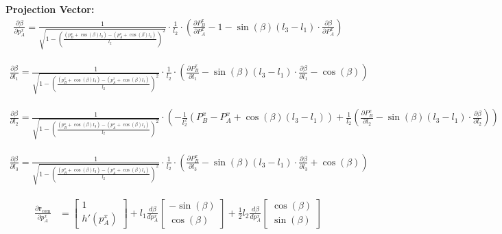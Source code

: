 \documentclass[10pt]{article}
\begin{document}
\textbf{Projection Vector: }
\begin{align*}
\frac{\partial \beta}{\partial p_A^x} = 
\frac{1}{\sqrt{1 - \left( \frac{(p_B^x + \cos(\beta) l_3) - (p_A^x + \cos(\beta) l_1)}{l_2} \right)^2}} 
\cdot 
\frac{1}{l_2}
\cdot 
\left( 
    \frac{\partial P_B^x}{\partial P_A^x}
    - 1
    -\sin(\beta)(l_3-l_1)\cdot \frac{\partial \beta}{\partial P_A^x}
\right)
\end{align*}

\begin{align*}
\frac{\partial \beta}{\partial l_1} = 
\frac{1}{\sqrt{1 - \left( \frac{(p_B^x + \cos(\beta) l_3) - (p_A^x + \cos(\beta) l_1)}{l_2} \right)^2}} 
\cdot 
\frac{1}{l_2}
\cdot 
\left( 
  \frac{\partial P_B^x}{\partial l_1}
  - \sin(\beta)(l_3 - l_1) \cdot \frac{\partial \beta}{\partial l_1}
  - \cos(\beta)
\right)
\end{align*}

\begin{align*}
\frac{\partial \beta}{\partial l_2} = 
\frac{1}{\sqrt{1 - \left( \frac{(p_B^x + \cos(\beta) l_3) - (p_A^x + \cos(\beta) l_1)}{l_2} \right)^2}} 
\cdot 
(
-\frac{1}{l_2^2}
\left( 
P_B^x - P_A^x + \cos(\beta)(l_3-l_1)
\right)
+
\frac{1}{l_2}
\left( 
  \frac{\partial P_B^x}{\partial l_2}
  - \sin(\beta)(l_3 - l_1) \cdot \frac{\partial \beta}{\partial l_2}
\right)
)
\end{align*}

\begin{align*}
\frac{\partial \beta}{\partial l_3} = 
\frac{1}{\sqrt{1 - \left( \frac{(p_B^x + \cos(\beta) l_3) - (p_A^x + \cos(\beta) l_1)}{l_2} \right)^2}} 
\cdot 
\frac{1}{l_2}
\cdot 
\left( 
  \frac{\partial P_B^x}{\partial l_3}
  - \sin(\beta)(l_3 - l_1) \cdot \frac{\partial \beta}{\partial l_3}
  + \cos(\beta)
\right)
\end{align*}

\begin{align*}
\frac{\partial \mathbf{r}_{\mathrm{com}}}{\partial p_A^x} &= 
\begin{bmatrix}
1 \\
h'(p_A^x)
\end{bmatrix}
+
l_1 \frac{d\beta}{dp_A^x}
\begin{bmatrix}
- \sin(\beta) \\
\cos(\beta)
\end{bmatrix}
+
\frac{1}{2} l_2 \frac{d\beta}{dp_A^x}
\begin{bmatrix}
\cos(\beta) \\
\sin(\beta)
\end{bmatrix}
\end{align*}
\end{document}
